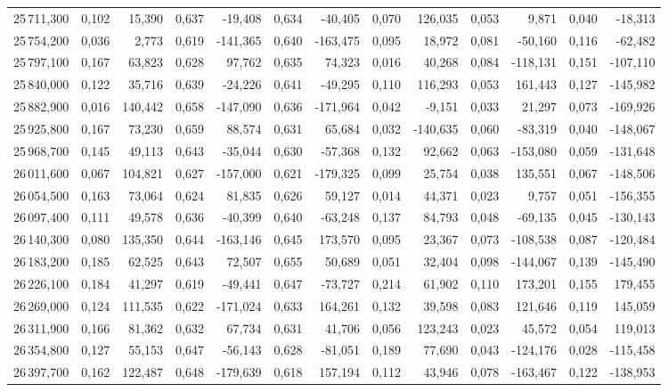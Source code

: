 \begin{longtable}{rrrrrrrrrrrrr}
25\,711,300 & 0,102 & 15,390 & 0,637 & -19,408 & 0,634 & -40,405 & 0,070 & 126,035 & 0,053 & 9,871 & 0,040 & -18,313\\
25\,754,200 & 0,036 & 2,773 & 0,619 & -141,365 & 0,640 & -163,475 & 0,095 & 18,972 & 0,081 & -50,160 & 0,116 & -62,482\\
25\,797,100 & 0,167 & 63,823 & 0,628 & 97,762 & 0,635 & 74,323 & 0,016 & 40,268 & 0,084 & -118,131 & 0,151 & -107,110\\
25\,840,000 & 0,122 & 35,716 & 0,639 & -24,226 & 0,641 & -49,295 & 0,110 & 116,293 & 0,053 & 161,443 & 0,127 & -145,982\\
25\,882,900 & 0,016 & 140,442 & 0,658 & -147,090 & 0,636 & -171,964 & 0,042 & -9,151 & 0,033 & 21,297 & 0,073 & -169,926\\
25\,925,800 & 0,167 & 73,230 & 0,659 & 88,574 & 0,631 & 65,684 & 0,032 & -140,635 & 0,060 & -83,319 & 0,040 & -148,067\\
25\,968,700 & 0,145 & 49,113 & 0,643 & -35,044 & 0,630 & -57,368 & 0,132 & 92,662 & 0,063 & -153,080 & 0,059 & -131,648\\
26\,011,600 & 0,067 & 104,821 & 0,627 & -157,000 & 0,621 & -179,325 & 0,099 & 25,754 & 0,038 & 135,551 & 0,067 & -148,506\\
26\,054,500 & 0,163 & 73,064 & 0,624 & 81,835 & 0,626 & 59,127 & 0,014 & 44,371 & 0,023 & 9,757 & 0,051 & -156,355\\
26\,097,400 & 0,111 & 49,578 & 0,636 & -40,399 & 0,640 & -63,248 & 0,137 & 84,793 & 0,048 & -69,135 & 0,045 & -130,143\\
26\,140,300 & 0,080 & 135,350 & 0,644 & -163,146 & 0,645 & 173,570 & 0,095 & 23,367 & 0,073 & -108,538 & 0,087 & -120,484\\
26\,183,200 & 0,185 & 62,525 & 0,643 & 72,507 & 0,655 & 50,689 & 0,051 & 32,404 & 0,098 & -144,067 & 0,139 & -145,490\\
26\,226,100 & 0,184 & 41,297 & 0,619 & -49,441 & 0,647 & -73,727 & 0,214 & 61,902 & 0,110 & 173,201 & 0,155 & 179,455\\
26\,269,000 & 0,124 & 111,535 & 0,622 & -171,024 & 0,633 & 164,261 & 0,132 & 39,598 & 0,083 & 121,646 & 0,119 & 145,059\\
26\,311,900 & 0,166 & 81,362 & 0,632 & 67,734 & 0,631 & 41,706 & 0,056 & 123,243 & 0,023 & 45,572 & 0,054 & 119,013\\
26\,354,800 & 0,127 & 55,153 & 0,647 & -56,143 & 0,628 & -81,051 & 0,189 & 77,690 & 0,043 & -124,176 & 0,028 & -115,458\\
26\,397,700 & 0,162 & 122,487 & 0,648 & -179,639 & 0,618 & 157,194 & 0,112 & 43,946 & 0,078 & -163,467 & 0,122 & -138,953\\

\end{longtable}
